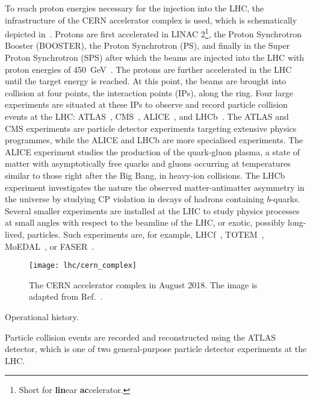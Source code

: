 To reach proton energies necessary for the injection into the LHC, the
infrastructure of the CERN accelerator complex is used, which is schematically
depicted in~. Protons are first accelerated
in LINAC 2\footnote{Short for \textbf{lin}ear \textbf{ac}celerator.}, the Proton
Synchrotron Booster (BOOSTER), the Proton Synchrotron (PS), and finally in the
Super Proton Synchrotron (SPS) after which the beams are injected into the LHC
with proton energies of \SI{450}{\GeV}~\cite{Evans:2008zzb}. The protons are
further accelerated in the LHC until the target energy is reached. At this
point, the beams are brought into collision at four points, the interaction
points (IPs), along the ring. Four large experiments are situated at these IPs
to observe and record particle collision events at the LHC:
ATLAS~\cite{PERF-2007-01}, CMS~\cite{CMS-CMS-00-001},
ALICE~\cite{ALICE:2008ngc}, and LHCb~\cite{LHCb:2008vvz}. The ATLAS and CMS
experiments are particle detector experiments targeting extensive physics
programmes, while the ALICE and LHCb are more specialised experiments. The ALICE
experiment studies the production of the quark-gluon plasma, a state of matter
with asymptotically free quarks and gluons occurring at temperatures similar to
those right after the Big Bang, in heavy-ion collisions. The LHCb experiment
investigates the nature the observed matter-antimatter asymmetry in the universe
by studying CP violation in decays of hadrons containing $b$-quarks. Several
smaller experiments are installed at the LHC to study physics processes at small
angles with respect to the beamline of the LHC, or exotic, possibly long-lived,
particles. Such experiments are, for example, LHCf~\cite{LHCf:2008lfy},
TOTEM~\cite{TOTEM:2008lue}, MoEDAL~\cite{MoEDAL:2009jwa}, or
FASER~\cite{FASER:2019aik}.

\begin{figure}[htbp]
  \centering

  \texttt{[image: lhc/cern\_complex]}

  \caption{The CERN accelerator complex in August 2018. The image is adapted
    from Ref.~\cite{Mobs:2684277}.}%
  \label{fig:cern_accelerator_complex}
\end{figure}

Operational history.

Particle collision events are recorded and reconstructed using the ATLAS
detector, which is one of two general-purpose particle detector experiments at
the LHC.

